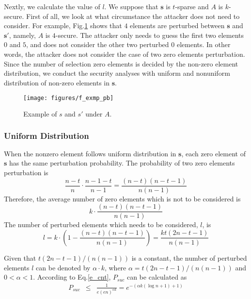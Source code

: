 \documentclass[conference]{IEEEtran}
\begin{document}
Nextly, we calculate the value of $l$. We suppose that $\mathbf{s}$ is $t$-sparse and $A$ is $k$-secure. First of all, we  look at what circumstance the attacker does not need to consider.  For example, Fig.\ref{f_examp_pb} shows that $4$ elements are perturbed between $\mathbf{s}$ and $\mathbf{s}'$, namely, $A$ is $4$-secure. The attacker only needs to guess the first two elements $0$ and $5$, and does not consider the other two perturbed $0$ elements. In other words, the attacker does not consider the case of two zero elements perturbation. Since the number of selection zero elements is decided by the non-zero element distribution, we conduct the security analyses with uniform and nonuniform distribution of non-zero elements in $\mathbf{s}$.

\begin{figure}
\begin{center}
  \texttt{[image: figures/f\_exmp\_pb]}\\
  \caption{{\footnotesize Example of $s$ and $s'$ under $A$.}}\label{f_examp_pb}
  \end{center}
\end{figure}
\subsubsection{Uniform Distribution}
When the nonzero element follows uniform distribution in $\mathbf{s}$, each zero element of $\mathbf{s}$ has the same perturbation probability. The probability of two zero elements perturbation is
\begin{equation*}
\frac{n-t}{n}\cdot\frac{n-1-t}{n-1}=\frac{(n-t)(n-t-1)}{n(n-1)}
\end{equation*}
Therefore, the average number of zero elements which is not to be considered is
\begin{equation*}
k\cdot\frac{(n-t)(n-t-1)}{n(n-1)}
\end{equation*}
The number of perturbed elements which needs to be considered, $l$,  is
\begin{equation*}
    l=k\cdot(1-\frac{(n-t)(n-t-1)}{n(n-1)})=\frac{kt(2n-t-1)}{n(n-1)}
\end{equation*}

Given that $t(2n-t-1)/(n(n-1))$ is a constant, the number of perturbed elements $l$ can be denoted by $\alpha\cdot k$, where $\alpha=t(2n-t-1)/(n(n-1))$ and $0<\alpha<1$.
According to Eq.\ref{e_cnt},  $P_{suc}$ can be calculated as
\begin{eqnarray} \label{e_cnl}
    P_{suc} & \leq & \frac{1}{e(en)^{\alpha k}} = e^{-(\alpha k(\log n+1)+1)}
\end{eqnarray}
\end{document}
